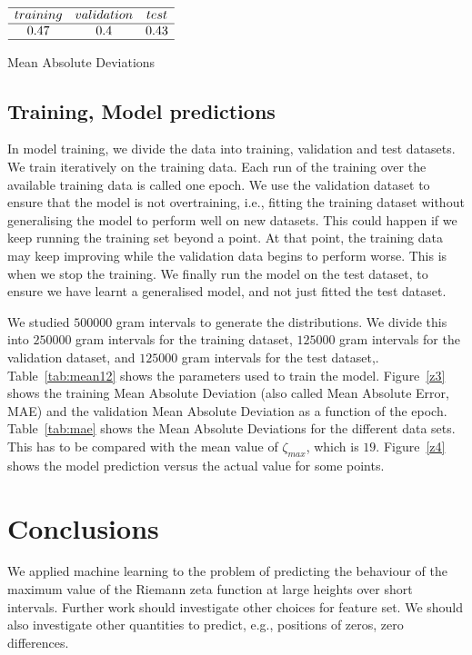 \documentclass[twoside]{article}
\begin{document}
\begin{table}
\centering \(\begin{array}{cccccccccccc}

\hline
training     &validation  &test \\
\hline
0.47 &0.4  & 0.43  \\
\hline
\end{array}\)
\caption{Mean Absolute Deviations}
\label{tab:mae}
\end{table}

\subsection{\label{relation}Training,  Model predictions}

In model training, we divide the data into training, validation and test datasets.
We train iteratively on the training data.
Each run of the training over the available training data is called one epoch.
We use the validation dataset to ensure
that the model is not overtraining, i.e., fitting the training dataset without generalising the model
to perform well on new datasets.  
This could happen if we keep running
the training set beyond a point. At that point, the training data may keep
improving while the validation data begins to perform worse.   This is when we stop the training.
We finally run the model on the test dataset, to ensure we have learnt a generalised model, and not
just fitted the test dataset.

We studied $500000$ gram intervals  to generate the distributions.
We divide this into $250000$ gram intervals for the training dataset, 
$125000$ gram intervals for the validation dataset, 
and $125000$ gram intervals for the test dataset,.
Table~\ref{tab:mean12} shows the parameters used to train the model. 
Figure~\ref{z3} shows the training Mean Absolute Deviation (also called Mean Absolute Error, MAE) 
and the validation Mean Absolute Deviation as a function of the epoch.
Table~\ref{tab:mae} shows the Mean Absolute Deviations for the different data sets.  This has
to be compared with the mean value of $\zeta_{max}$, which is $19$.  Figure~\ref{z4}
shows the model prediction versus the actual value for some points.

\section{\label{conclusions}Conclusions}
We applied
machine learning to the problem of predicting the behaviour of the maximum value
of the Riemann zeta function at large heights over short intervals.
Further work should investigate other choices for feature set. 
We should also investigate other quantities to predict, e.g., positions of 
zeros, zero differences.
\end{document}
